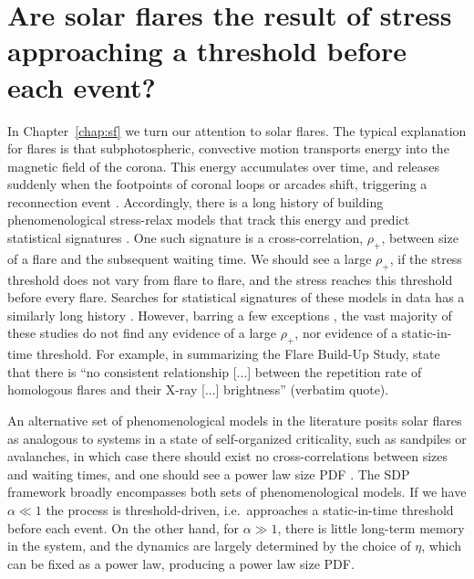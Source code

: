 \section{Are solar flares the result of stress approaching a threshold before each event?} \label{sec:concl_sf}
In Chapter~\ref{chap:sf} we turn our attention to solar flares. The typical explanation for flares is that subphotospheric, convective motion transports energy into the magnetic field of the corona. This energy accumulates over time, and releases suddenly when the footpoints of coronal loops or arcades shift, triggering a reconnection event \citep{Priest2002,Benz2016}. Accordingly, there is a long history of building phenomenological stress-relax models that track this energy and predict statistical signatures \citep{Rosner1978,Wheatland1998,Wheatland2000corr,Wheatland2008,Hudson2019}. One such signature is a cross-correlation, $\rho_+$, between size of a flare and the subsequent waiting time. We should see a large $\rho_+$, if the stress threshold does not vary from flare to flare, and the stress reaches this threshold before every flare. Searches for statistical signatures of these models in data has a similarly long history \citep{Gaizauskas1987,Biesecker1994,Crosby1998,Hudson1998,Hudson2019,Hudson2020}. However, barring a few exceptions \citep{Ellison1963,Hudson2019}, the vast majority of these studies do not find any evidence of a large $\rho_+$, nor evidence of a static-in-time threshold. For example, in summarizing the Flare Build-Up Study, \citet{Gaizauskas1987} state that there is ``no consistent relationship [...] between the repetition rate of homologous flares and their X-ray [...] brightness'' (verbatim quote).
 
An alternative set of phenomenological models in the literature posits solar flares as analogous to systems in a state of self-organized criticality, such as sandpiles or avalanches, in which case there should exist no cross-correlations between sizes and waiting times, and one should see a power law size PDF \citep{Parker1988,Lu1991,Lu1995,Charbonneau2001}. The SDP framework broadly encompasses both sets of phenomenological models. If we have $\alpha \ll 1$ the process is threshold-driven, i.e.~approaches a static-in-time threshold before each event. On the other hand, for $\alpha \gg 1$, there is little long-term memory in the system, and the dynamics are largely determined by the choice of $\eta$, which can be fixed as a power law, producing a power law size PDF.

